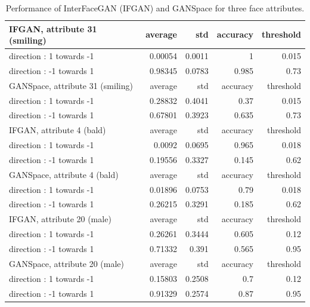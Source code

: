 \documentclass[a4paper]{article}
\begin{document}
\begin{table}[hbt!]
    \centering
    \begin{tabular}{lrrrr}
    \hline
     IFGAN, attribute 31 (smiling)      &   average &    std &   accuracy &   threshold \\
    \hline
     direction : 1 towards -1 &   0.00054 & 0.0011 &      1     &       0.015 \\
     direction : -1 towards 1 &   0.98345 & 0.0783 &      0.985 &       0.73  \\
    \hline
    \hline
     GANSpace, attribute 31 (smiling)   &   average &    std &   accuracy &   threshold \\
    \hline
     direction : 1 towards -1 &   0.28832 & 0.4041 &      0.37  &       0.015 \\
     direction : -1 towards 1 &   0.67801 & 0.3923 &      0.635 &       0.73  \\
    \hline
    \hline
     IFGAN, attribute 4 (bald)       &   average &    std &   accuracy &   threshold \\
    \hline
     direction : 1 towards -1 &   0.0092  & 0.0695 &      0.965 &       0.018 \\
     direction : -1 towards 1 &   0.19556 & 0.3327 &      0.145 &       0.62  \\
    \hline
    \hline
     GANSpace, attribute 4 (bald)    &   average &    std &   accuracy &   threshold \\
    \hline
     direction : 1 towards -1 &   0.01896 & 0.0753 &      0.79  &       0.018 \\
     direction : -1 towards 1 &   0.26215 & 0.3291 &      0.185 &       0.62  \\
    \hline
    \hline
     IFGAN, attribute 20 (male)      &   average &    std &   accuracy &   threshold \\
    \hline
     direction : 1 towards -1 &   0.26261 & 0.3444 &      0.605 &        0.12 \\
     direction : -1 towards 1 &   0.71332 & 0.391  &      0.565 &        0.95 \\
    \hline
    \hline
     GANSpace, attribute 20 (male)   &   average &    std &   accuracy &   threshold \\
    \hline
     direction : 1 towards -1 &   0.15803 & 0.2508 &       0.7  &        0.12 \\
     direction : -1 towards 1 &   0.91329 & 0.2574 &       0.87 &        0.95 \\
    \hline
    \end{tabular}
    \caption{Performance of InterFaceGAN (IFGAN) and GANSpace for three face attributes.}
    \label{tab:performance}
\end{table}
\end{document}
